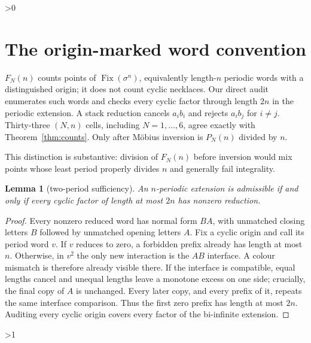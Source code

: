 \documentclass[11pt]{article}
\newtheorem{lemma}{Lemma}
\newcommand{\Fix}{\operatorname{Fix}}
\begin{document}
\ifnum\CRevisionRound>0
\section{The origin-marked word convention}
$F_N(n)$ counts points of $\Fix(\sigma^n)$, equivalently length-$n$ periodic
words with a distinguished origin; it does not count cyclic necklaces.  Our
direct audit enumerates such words and checks every cyclic factor through
length $2n$ in the periodic extension.  A stack reduction cancels $a_i b_i$
and rejects $a_i b_j$ for $i\ne j$.  Thirty-three $(N,n)$ cells, including
$N=1,\ldots,6$, agree exactly with Theorem~\ref{thm:counts}.  Only after
M\"obius inversion is $P_N(n)$ divided by $n$.

This distinction is substantive: division of $F_N(n)$ before inversion would
mix points whose least period properly divides $n$ and generally fail
integrality.
\begin{lemma}[two-period sufficiency]
An $n$-periodic extension is admissible if and only if every cyclic factor of
length at most $2n$ has nonzero reduction.
\end{lemma}
\begin{proof}
Every nonzero reduced word has normal form $BA$, with unmatched closing letters
$B$ followed by unmatched opening letters $A$.  Fix a cyclic origin and call
its period word $v$.  If $v$ reduces to zero, a forbidden prefix already has
length at most $n$.  Otherwise, in $v^2$ the only new interaction is the
$AB$ interface.  A colour mismatch is therefore already visible there.  If
the interface is compatible, equal lengths cancel and unequal lengths leave a
monotone excess on one side; crucially, the final copy of $A$ is unchanged.
Every later copy, and every prefix of it, repeats the same interface comparison.
Thus the first zero prefix has length at most $2n$.  Auditing every cyclic
origin covers every factor of the bi-infinite extension.
\end{proof}
\fi

\ifnum\CRevisionRound>1
\end{document}

